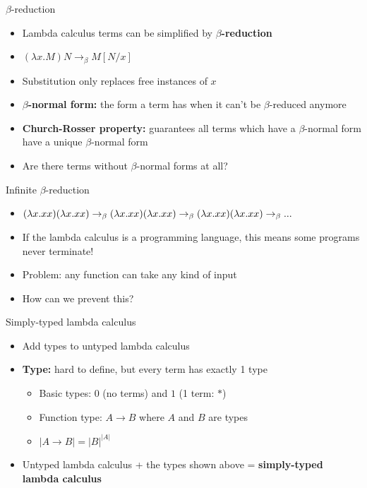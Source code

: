 \documentclass{beamer}
\begin{document}
\begin{frame}{$\beta$-reduction}
    \begin{itemize}
        \item Lambda calculus terms can be simplified by \textbf{$\beta$-reduction}
        \item $(\lambda x. M) N \to_\beta M[N/x]$
        \item Substitution only replaces free instances of $x$
        \item \textbf{$\beta$-normal form:} the form a term has when it can't be $\beta$-reduced anymore
        \item \textbf{Church-Rosser property:} guarantees all terms which have a $\beta$-normal form have a unique $\beta$-normal form
        \item Are there terms without $\beta$-normal forms at all?
    \end{itemize}
\end{frame}

\begin{frame}{Infinite $\beta$-reduction}
    \begin{itemize}
        \item $(\lambda x. xx)(\lambda x. xx) \newline
        \to_\beta (\lambda x. xx)(\lambda x. xx) \newline
        \to_\beta (\lambda x. xx)(\lambda x. xx) \newline
        \to_\beta ...$
        \item If the lambda calculus is a programming language, this means some programs never terminate!
        \item Problem: any function can take any kind of input
        \item How can we prevent this?
    \end{itemize}
\end{frame}

\begin{frame}{Simply-typed lambda calculus}
    \begin{itemize}
        \item Add types to untyped lambda calculus
        \item \textbf{Type:} hard to define, but every term has exactly 1 type
        \begin{itemize}
            \item Basic types: $0$ (no terms) and $1$ (1 term: $*$)
            \item Function type: $A \to B$ where $A$ and $B$ are types
            \item $|A \to B| = |B|^{|A|}$
        \end{itemize}
        \item Untyped lambda calculus + the types shown above = \textbf{simply-typed lambda calculus}
    \end{itemize}
\end{frame}
\end{document}
